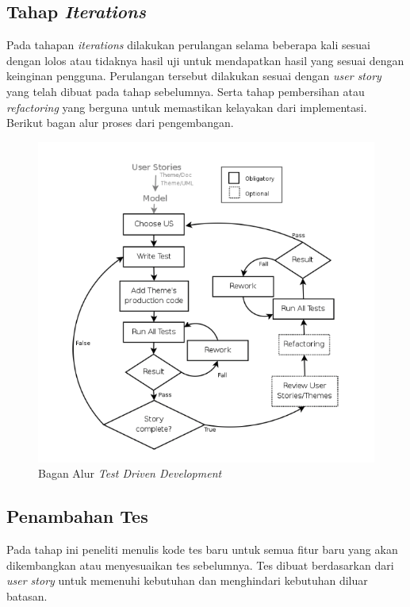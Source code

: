 \begin{spacing}{2}
  \section{Tahap \emph{Iterations}}
    Pada tahapan \emph{iterations} dilakukan perulangan selama beberapa kali sesuai dengan lolos atau tidaknya hasil uji untuk mendapatkan hasil yang sesuai dengan keinginan pengguna. Perulangan tersebut dilakukan sesuai dengan \emph{user story} yang telah dibuat pada tahap sebelumnya. Serta tahap pembersihan atau \emph{refactoring} yang berguna untuk memastikan kelayakan dari implementasi. Berikut bagan alur proses dari pengembangan.

    \begin{figure}[H]
      \centering
      \includegraphics[width=1\textwidth]{images/bagan-tdd}
      \caption{Bagan Alur \emph{Test Driven Development}}
      \label{bagan-tdd}
    \end{figure}

    \subsection{Penambahan Tes}
      Pada tahap ini peneliti menulis kode tes baru untuk semua fitur baru yang akan dikembangkan atau menyesuaikan tes sebelumnya. Tes dibuat berdasarkan dari \emph{user story} untuk memenuhi kebutuhan dan menghindari kebutuhan diluar batasan.


\end{spacing}
